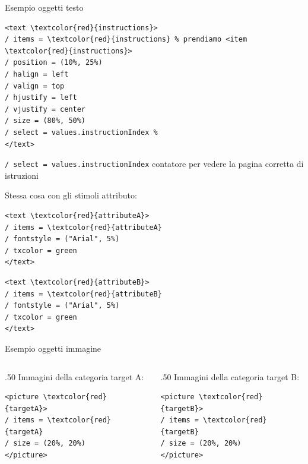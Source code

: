 \documentclass{beamer}
\begin{document}
\begin{frame}[fragile]{Esempio oggetti testo}
	
	\begin{small}
	\begin{Verbatim}[commandchars=\\\{\}]
<text \textcolor{red}{instructions}>
/ items = \textcolor{red}{instructions} % prendiamo <item \textcolor{red}{instructions}>
/ position = (10%, 25%)
/ halign = left
/ valign = top
/ hjustify = left
/ vjustify = center
/ size = (80%, 50%)
/ select = values.instructionIndex % 
</text>
\end{Verbatim}
	\end{small}

\texttt{/ select = values.instructionIndex} contatore per vedere la pagina corretta di istruzioni

\end{frame}


\begin{frame}[fragile]
	Stessa cosa con gli stimoli attributo:
	\vspace{3mm}
	\begin{Verbatim}[commandchars=\\\{\}]
<text \textcolor{red}{attributeA}>
/ items = \textcolor{red}{attributeA}
/ fontstyle = ("Arial", 5%)
/ txcolor = green
</text>
	\end{Verbatim}

		\begin{Verbatim}[commandchars=\\\{\}]
<text \textcolor{red}{attributeB}>
/ items = \textcolor{red}{attributeB}
/ fontstyle = ("Arial", 5%)
/ txcolor = green
</text>
	\end{Verbatim}
	
\end{frame}

\begin{frame}[fragile]{Esempio oggetti immagine}
	
	\begin{columns}
		\begin{column}{.50\linewidth}
Immagini della categoria target A: 
\begin{Verbatim}[commandchars=\\\{\}]
<picture \textcolor{red}{targetA}>
/ items = \textcolor{red}{targetA}
/ size = (20%, 20%)
</picture>
		\end{Verbatim}
		\end{column}
\begin{column}{.50\linewidth}
Immagini della categoria target B: 
\begin{Verbatim}[commandchars=\\\{\}]
<picture \textcolor{red}{targetB}>
/ items = \textcolor{red}{targetB}
/ size = (20%, 20%)
</picture>
		\end{Verbatim}
	\end{column}
	\end{columns}
\end{frame}
\end{document}
